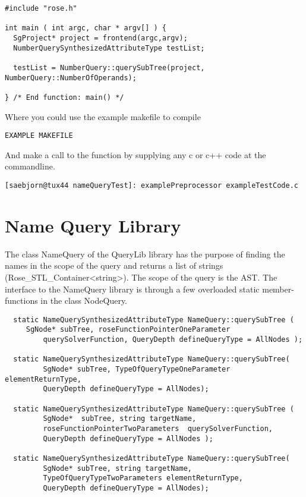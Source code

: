 {\begin{verbatim}
#include "rose.h"

int main ( int argc, char * argv[] ) {
  SgProject* project = frontend(argc,argv);
  NumberQuerySynthesizedAttributeType testList;
  
  testList = NumberQuery::querySubTree(project, NumberQuery::NumberOfOperands);

} /* End function: main() */
\end{verbatim}
Where you could use the example makefile to compile
\begin{verbatim}
EXAMPLE MAKEFILE
\end{verbatim}
And make a call to the function by supplying any c or c++ code at the commandline.
\begin{verbatim}
[saebjorn@tux44 nameQueryTest]: examplePreprocessor exampleTestCode.c
\end{verbatim}


 
\section{Name Query Library}

The class NameQuery of the QueryLib library has the purpose of
finding the names in the scope of the query and returns a list of
strings (Rose_STL_Container<string>). The scope of the query is
the AST. The interface to the NameQuery library is through a few
overloaded static member-functions in the class NodeQuery.

\begin{verbatim}
  static NameQuerySynthesizedAttributeType NameQuery::querySubTree (
	 SgNode* subTree, roseFunctionPointerOneParameter 
         querySolverFunction, QueryDepth defineQueryType = AllNodes );

  static NameQuerySynthesizedAttributeType NameQuery::querySubTree( 
         SgNode* subTree, TypeOfQueryTypeOneParameter elementReturnType,
         QueryDepth defineQueryType = AllNodes);
	 	
  static NameQuerySynthesizedAttributeType NameQuery::querySubTree (
         SgNode*  subTree, string targetName,
         roseFunctionPointerTwoParameters  querySolverFunction,
         QueryDepth defineQueryType = AllNodes );
	  
  static NameQuerySynthesizedAttributeType NameQuery::querySubTree( 
         SgNode* subTree, string targetName, 
         TypeOfQueryTypeTwoParameters elementReturnType,
         QueryDepth defineQueryType = AllNodes);	  
\end{verbatim}  


}
